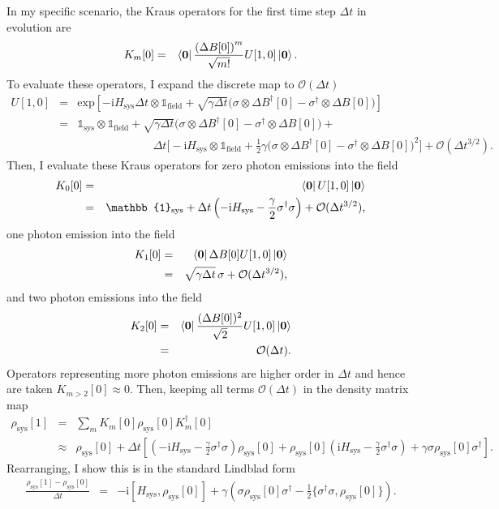 \documentclass[%
 onecolumn,
 notitlepage,
 longbibliography,
 amsmath,amssymb,
 aps,
 pra,
 10pt,
]{revtex4-1}
\begin{document}
In my specific scenario, the Kraus operators for the first time step $\Delta t$ in evolution are
\begin{eqnarray}
K_{m}[0]&=&\bra{\mathbf{0}}\frac{\left(\Delta B[0]\right)^m}{\sqrt{m!}} U[1,0]\ket{\mathbf{0}}.
\end{eqnarray}
To evaluate these operators, I expand the discrete map to $\mathcal{O}(\Delta t)$
\begin{eqnarray}
U[1,0]&=&\textrm{exp}\left[-\textrm{i}H_\text{sys}\Delta t\otimes\mathbb{1}_\text{field}+\sqrt{\gamma\Delta t}\Big(\sigma \otimes\Delta B^\dagger[0] - \sigma^\dagger\otimes\Delta B[0] \Big)\right]\\
&=&\mathbb{1}_\text{sys}\otimes \mathbb{1}_\text{field} + \sqrt{\gamma\Delta t}\Big(\sigma \otimes\Delta B^\dagger[0] - \sigma^\dagger\otimes\Delta B[0] \Big)+ \nonumber\\
&&\hspace{80pt} \Delta t\Big[-\text{i}H_\text{sys}\otimes\mathbb{1}_\text{field} +\frac{1}{2}\gamma\Big(\sigma \otimes\Delta B^\dagger[0] - \sigma^\dagger\otimes\Delta B[0] \Big)^2\Big] + \mathcal{O}(\Delta t^{3/2}).
\end{eqnarray}
Then, I evaluate these Kraus operators for zero photon emissions into the field
\begin{eqnarray}
K_{0}[0]&=&\bra{\mathbf{0}}U[1,0]\ket{\mathbf{0}}\\
&= & \mathbb{1}_\text{sys}+\Delta t\left(-\text{i}H_\text{sys} -\frac{\gamma}{2}\sigma^\dagger\sigma\right) + \mathcal{O}(\Delta t^{3/2}),
\end{eqnarray}
one photon emission into the field
\begin{eqnarray}
K_{1}[0]&=&\bra{\mathbf{0}}\Delta B[0]U[1,0]\ket{\mathbf{0}}\\
&= & \sqrt{\gamma\Delta t}\, \sigma + \mathcal{O}(\Delta t^{3/2}),
\end{eqnarray}
and two photon emissions into the field
\begin{eqnarray}
K_{2}[0]&=&\bra{\mathbf{0}}\frac{(\Delta B[0])^2}{\sqrt{2}}U[1,0]\ket{\mathbf{0}}\\
&= & \mathcal{O}(\Delta t).
\end{eqnarray}
Operators representing more photon emissions are higher order in $\Delta t$ and hence are taken $K_{m>2}[0]\approx 0$. Then, keeping all terms $\mathcal{O}(\Delta t)$ in the density matrix map
\begin{eqnarray}
\rho_\text{sys}[1]&=&\sum_m K_{m}[0]\rho_\text{sys}[0]K_{m}^\dagger[0]\\
&\approx&\rho_\text{sys}[0]+\Delta t\left[\left(-\text{i}H_\text{sys} -\frac{\gamma}{2}\sigma^\dagger\sigma\right)\rho_\text{sys}[0]+\rho_\text{sys}[0]\left(\text{i}H_\text{sys}-\frac{\gamma}{2}\sigma^\dagger\sigma\right) + \gamma \sigma\rho_\text{sys}[0]\sigma^\dagger\right].
\end{eqnarray}
Rearranging, I show this is in the standard Lindblad form
\begin{eqnarray}
\frac{\rho_\text{sys}[1]-\rho_\text{sys}[0]}{\Delta t}&=&-\text{i}\left[H_\text{sys}, \rho_\text{sys}[0]\right] + \gamma\left(\sigma \rho_\text{sys}[0]\sigma^\dagger-\frac{1}{2}\{\sigma^\dagger\sigma,\rho_\text{sys}[0]\}\right).
\end{eqnarray}
\end{document}

